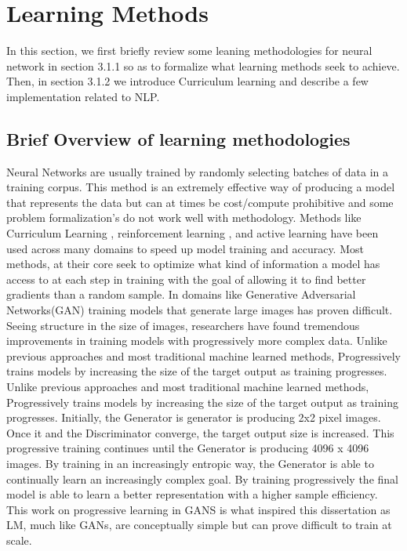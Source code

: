\section{Learning Methods}
In this section, we first briefly review some leaning methodologies for neural network in section 3.1.1 so as to formalize what learning methods seek to achieve. Then, in section 3.1.2 we introduce Curriculum learning and describe a few implementation related to NLP. 
\subsection{Brief Overview of learning methodologies}
Neural Networks are usually trained by randomly selecting batches of data in a training corpus. This method is an extremely effective way of producing a model that represents the data but can at times be cost/compute prohibitive and some problem formalization's do not work well with methodology. Methods like Curriculum Learning \cite{Bengio2009CurriculumL}, reinforcement learning \cite{Sutton1998ReinforcementLA}, and active learning \cite{Cohn1994ActiveLW} have been used across many domains to speed up model training and accuracy. Most methods, at their core seek to optimize what kind of information a model has access to at each step in training with the goal of allowing it to find better gradients than a random sample. In domains like Generative Adversarial Networks(GAN) \cite{Goodfellow2014GenerativeAN} training models that generate large images has proven difficult. Seeing structure in the size of images, researchers have found tremendous improvements in training models with progressively more complex data. Unlike previous approaches and most traditional machine learned methods, Progressively trains models by increasing the size of the target output as training progresses\cite{Karras2017ProgressiveGO}. Unlike previous approaches and most traditional machine learned methods, Progressively trains models by increasing the size of the target output as training progresses. Initially, the Generator is generator is producing 2x2 pixel images. Once it and the Discriminator converge, the target output size is increased. This progressive training continues until the Generator is producing 4096 x 4096 images. By training in an increasingly entropic way, the Generator is able to continually learn an increasingly complex goal. By training progressively the final model is able to learn a better representation with a higher sample efficiency. This work on progressive learning in GANS is what inspired this dissertation as LM, much like GANs, are conceptually simple but can prove difficult to train at scale. 
